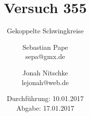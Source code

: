 

\title{Versuch 355}
\subtitle{Gekoppelte Schwingkreise}
\author{Sebastian Pape\\
        sepa@gmx.de \and
        Jonah Nitschke\\
        lejonah@web.de}
\date{Durchführung: 10.01.2017\\
      Abgabe: 17.01.2017}


\maketitle




\printbibliography

